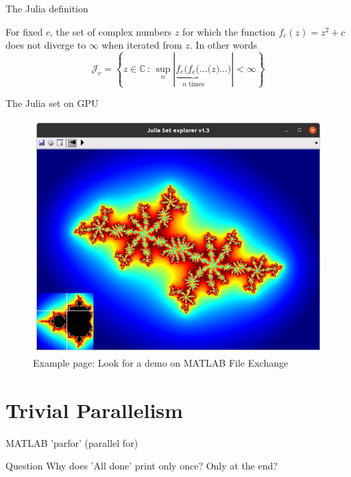 \documentclass[pdflatex,colorlinks,landscape]{beamer}
\renewcommand\emph[1]{{\color{magenta}#1}}
\begin{document}
\begin{frame}{The Julia definition}
  \begin{definition}  For fixed $c$, the set of complex numbers $z$
    for which the function $f_c(z) = z^2 + c$ does not diverge to $\infty$
    when iterated from $z$. In other words
    \begin{equation*}
      \mathcal{J}_c = \left\{ z\in\mathbb{C}\,:\,
      \sup_{n}\left|\underbrace{f_c(f_c(\ldots(}_{\text{$n$ times}} z)\ldots)\right| < \infty
      \right\}
    \end{equation*}
  \end{definition}
\end{frame}

\begin{frame}{The Julia set on GPU}
  \begin{figure}
    \includegraphics[width=.8\textwidth]{Julia.png}
    \caption{Example page: Look for a demo on MATLAB \emph{File Exchange}}
  \end{figure}
\end{frame}

\section{Trivial Parallelism}

\begin{frame}[allowframebreaks]{MATLAB 'parfor' (parallel for)}
  \begin{tiny}
    
  \end{tiny}
  \begin{tiny}
  \end{tiny}
  \begin{block}{Question}
    Why does 'All done' print only once? Only at the end?
  \end{block}
\end{frame}
\end{document}
